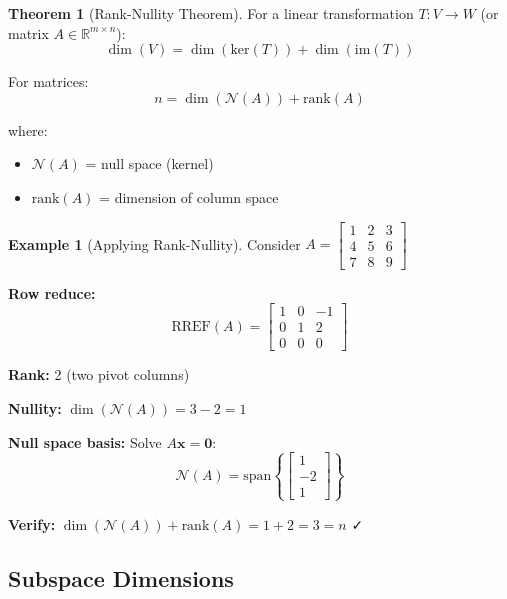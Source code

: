 \documentclass[12pt,a4paper]{article}
\theoremstyle{definition}
\newtheorem{theorem}{Theorem}[section]
\newtheorem{example}{Example}[section]
\begin{document}
\begin{theorem}[Rank-Nullity Theorem]
For a linear transformation $T: V \to W$ (or matrix $A \in \mathbb{R}^{m \times n}$):
\begin{equation}
\dim(V) = \dim(\text{ker}(T)) + \dim(\text{im}(T))
\end{equation}

For matrices:
\begin{equation}
n = \dim(\mathcal{N}(A)) + \text{rank}(A)
\end{equation}

where:
\begin{itemize}
    \item $\mathcal{N}(A)$ = null space (kernel)
    \item $\text{rank}(A)$ = dimension of column space
\end{itemize}
\end{theorem}

\begin{example}[Applying Rank-Nullity]
Consider $A = \begin{bmatrix} 1 & 2 & 3 \\ 4 & 5 & 6 \\ 7 & 8 & 9 \end{bmatrix}$

\textbf{Row reduce:}
\begin{equation}
\text{RREF}(A) = \begin{bmatrix} 1 & 0 & -1 \\ 0 & 1 & 2 \\ 0 & 0 & 0 \end{bmatrix}
\end{equation}

\textbf{Rank:} 2 (two pivot columns)

\textbf{Nullity:} $\dim(\mathcal{N}(A)) = 3 - 2 = 1$

\textbf{Null space basis:} Solve $A\mathbf{x} = \mathbf{0}$:
\begin{equation}
\mathcal{N}(A) = \text{span}\left\{\begin{bmatrix} 1 \\ -2 \\ 1 \end{bmatrix}\right\}
\end{equation}

\textbf{Verify:} $\dim(\mathcal{N}(A)) + \text{rank}(A) = 1 + 2 = 3 = n$ ✓
\end{example}

\subsection{Subspace Dimensions}
\end{document}
